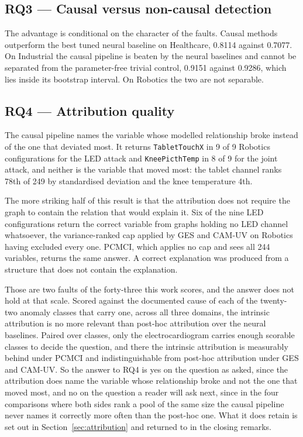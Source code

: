 \subsection*{RQ3 --- Causal versus non-causal detection}
The advantage is conditional on the character of the faults. Causal methods outperform the best tuned neural baseline on Healthcare, 0.8114 against 0.7077. On Industrial the causal pipeline is beaten by the neural baselines and cannot be separated from the parameter-free trivial control, 0.9151 against 0.9286, which lies inside its bootstrap interval. On Robotics the two are not separable.

\subsection*{RQ4 --- Attribution quality}
The causal pipeline names the variable whose modelled relationship broke instead of the one that deviated most. It returns \texttt{TabletTouchX} in 9 of 9 Robotics configurations for the LED attack and \texttt{KneePicthTemp} in 8 of 9 for the joint attack, and neither is the variable that moved most: the tablet channel ranks 78th of 249 by standardised deviation and the knee temperature 4th.

The more striking half of this result is that the attribution does not require the graph to contain the relation that would explain it. Six of the nine LED configurations return the correct variable from graphs holding no LED channel whatsoever, the variance-ranked cap applied by GES and CAM-UV on Robotics having excluded every one. PCMCI, which applies no cap and sees all 244 variables, returns the same answer. A correct explanation was produced from a structure that does not contain the explanation.

Those are two faults of the forty-three this work scores, and the answer does not hold at that scale. Scored against the documented cause of each of the twenty-two anomaly classes that carry one, across all three domains, the intrinsic attribution is no more relevant than post-hoc attribution over the neural baselines. Paired over classes, only the electrocardiogram carries enough scorable classes to decide the question, and there the intrinsic attribution is measurably behind under PCMCI and indistinguishable from post-hoc attribution under GES and CAM-UV. So the answer to RQ4 is yes on the question as asked, since the attribution does name the variable whose relationship broke and not the one that moved most, and no on the question a reader will ask next, since in the four comparisons where both sides rank a pool of the same size the causal pipeline never names it correctly more often than the post-hoc one. What it does retain is set out in Section~\ref{sec:attribution} and returned to in the closing remarks.

